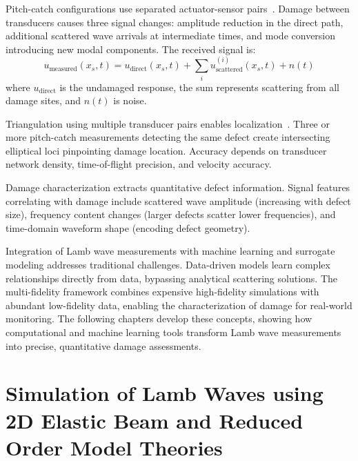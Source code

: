 \documentclass[12pt,a4paper]{report}
\begin{document}
Pitch-catch configurations use separated actuator-sensor pairs~\cite{su2009}. Damage between transducers causes three signal changes: amplitude reduction in the direct path, additional scattered wave arrivals at intermediate times, and mode conversion introducing new modal components. The received signal is:
\begin{equation}
u_{\text{measured}}(x_s, t) = u_{\text{direct}}(x_s, t) + \sum_{i} u_{\text{scattered}}^{(i)}(x_s, t) + n(t)
\end{equation}
where $u_{\text{direct}}$ is the undamaged response, the sum represents scattering from all damage sites, and $n(t)$ is noise.

Triangulation using multiple transducer pairs enables localization~\cite{giurgiutiu2008}. Three or more pitch-catch measurements detecting the same defect create intersecting elliptical loci pinpointing damage location. Accuracy depends on transducer network density, time-of-flight precision, and velocity accuracy.

Damage characterization extracts quantitative defect information. Signal features correlating with damage include scattered wave amplitude (increasing with defect size), frequency content changes (larger defects scatter lower frequencies), and time-domain waveform shape (encoding defect geometry).


Integration of Lamb wave measurements with machine learning and surrogate modeling addresses traditional challenges. Data-driven models learn complex relationships directly from data, bypassing analytical scattering solutions. The multi-fidelity framework combines expensive high-fidelity simulations with abundant low-fidelity data, enabling the characterization of damage for real-world monitoring. The following chapters develop these concepts, showing how computational and machine learning tools transform Lamb wave measurements into precise, quantitative damage assessments.

\chapter{Simulation of Lamb Waves using 2D Elastic Beam and Reduced Order Model Theories}
\label{Introduce different 1D models and a reference 2D model}
\end{document}
